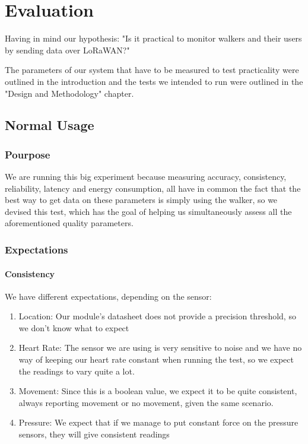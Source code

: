 \chapter{Evaluation}
\label{cha:evaluation}

Having in mind our hypothesis: "Is it practical to monitor walkers and their users by sending data over LoRaWAN?"

The parameters of our system that have to be measured to test practicality were outlined in the introduction and the tests we intended to run were outlined in the "Design and Methodology" chapter.


\section{Normal Usage}

	\subsection{Pourpose}
		We are running this big experiment because measuring accuracy, consistency, reliability, latency and energy consumption, all have in common the fact that the best way to get data on these parameters is simply using the walker, so we devised this test, which has the goal of helping us simultaneously assess all the aforementioned quality parameters.

	\subsection{Expectations}
		\subsubsection{Consistency}
			We have different expectations, depending on the sensor:

			\begin{enumerate}
				\item Location: Our module's datasheet does not provide a precision threshold, so we don't know what to expect
				\item Heart Rate: The sensor we are using is very sensitive to noise and we have no way of keeping our heart rate constant when running the test, so we expect the readings to vary quite a lot.
				\item Movement: Since this is a boolean value, we expect it to be quite consistent, always reporting movement or no movement, given the same scenario.
				\item Pressure: We expect that if we manage to put constant force on the pressure sensors, they will give consistent readings
			\end{enumerate}

